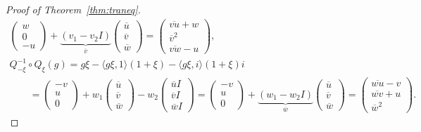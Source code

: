 \documentclass[10pt,a4paper]{amsart}
\numberwithin{equation}{section}
\begin{document}
\begin{proof}[Proof of Theorem~\ref{thm:traneq}]
\begin{gather*}
\begin{pmatrix}
 w \\ 0 \\ -u
 \end{pmatrix}+ \underbrace{(v_1-v_2I)}_{\overline{v}}
 \begin{pmatrix}
 \overline{u} \\ \overline{v} \\ \overline{w}
 \end{pmatrix}=
 \begin{pmatrix}
 \overline{vu} +w\\ \overline{v}^2 \\ \overline{vw}-u
 \end{pmatrix},\\
 Q_{-\xi}^{-1}\circ Q_\xi(g)=g \xi- \langle g \xi,1\rangle(1+\xi)- \langle g\xi ,i\rangle (1+\xi)i \\
 \qquad{}=\begin{pmatrix}
 -v \\ u \\ 0
 \end{pmatrix} + w_1
 \begin{pmatrix}
 \overline{u} \\ \overline{v} \\ \overline{w}
 \end{pmatrix}
 - w_2
 \begin{pmatrix}
 \overline{u} I \\ \overline{v} I \\ \overline{w}I
 \end{pmatrix}=
 \begin{pmatrix}
 -v \\ u \\ 0
 \end{pmatrix}+ \underbrace{(w_1-w_2I)}_{\overline{w}}
 \begin{pmatrix}
 \overline{u} \\ \overline{v} \\ \overline{w}
 \end{pmatrix}=
 \begin{pmatrix}
 \overline{wu} -v\\ \overline{wv}+u \\ \overline{w}^2
 \end{pmatrix}.
 \end{gather*}


\end{proof}
\end{document}
